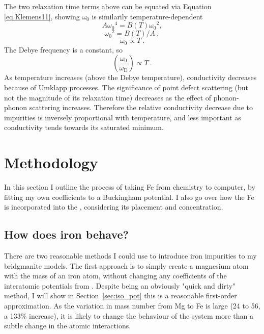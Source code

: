 The two relaxation time terms above can be equated via Equation \ref{eq.Klemens11}, showing $\omega_{0}$ is similarily temperature-dependent
%
$$A{\omega_{0}}^{4}=B\left(T\right){\omega_{0}}^{2},$$
$${\omega_{0}}^{2}=B\left(T\right)/A\ ,$$
%
\begin{equation}
\omega_{0} \propto T\ .
\label{eq.Klemens23mod}
\end{equation}
%
The Debye frequency is a constant, so
%
\begin{equation}
\left (\frac{\omega_{\mathrm{0}}}{\omega_{\mathrm{D}}} \right ) \propto T\ .
\label{eq.Klemens23mod2}
\end{equation}
%
As temperature increases (above the Debye temperature), conductivity decreases because of Umklapp processes. The significance of point defect scattering (but not the magnitude of its relaxation time) decreases as the effect of phonon-phonon scattering increases. Therefore the relative conductivity decrease due to impurities is inversely proportional with temperature, and less important as conductivity tends towards its saturated minimum.



\section{Methodology}

In this section I outline the process of taking Fe from chemistry to computer, by fitting my own coefficients to a Buckingham potential. I also go over how the Fe is incorporated into the \mgsio, considering its placement and concentration.

\subsection{How does iron behave?} 

There are two reasonable methods I could use to introduce iron impurities to my bridgmanite models. The first approach is to simply create a magnesium atom with the mass of an iron atom, without changing any coefficients of the interatomic potentials from \citet{Oganov2000}. Despite being an obviously "quick and dirty" method, I will show in Section~\ref{sec:iso_pot} this is a reasonable first-order approximation. As the variation in mass number from Mg to Fe is large (24 to 56, a 133\% increase), it is likely to change the behaviour of the system more than a subtle change in the atomic interactions.

